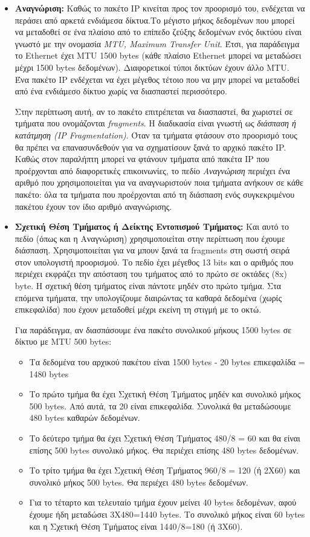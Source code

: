 \begin{itemize}
\item \textbf{Αναγνώριση:} Καθώς το πακέτο IP κινείται προς τον προορισμό του, ενδέχεται να περάσει από αρκετά ενδιάμεσα δίκτυα.Το μέγιστο μήκος δεδομένων που μπορεί να μεταδοθεί σε ένα πλαίσιο από το επίπεδο ζεύξης δεδομένων ενός δικτύου είναι γνωστό με την ονομασία \emph{MTU, Maximum Transfer Unit}. Έτσι, για παράδειγμα το Ethernet έχει MTU 1500 bytes (κάθε πλαίσιο Ethernet μπορεί να μεταδώσει μέχρι 1500 bytes δεδομένων). Διαφορετικοί τύποι δικτύων έχουν άλλο MTU. Ένα πακέτο IP ενδέχεται να έχει μέγεθος τέτοιο που να μην μπορεί να μεταδοθεί από ένα ενδιάμεσο δίκτυο χωρίς να διασπαστεί περισσότερο. 

Στην περίπτωση αυτή, αν το πακέτο επιτρέπεται να διασπαστεί, θα χωριστεί σε τμήματα που ονομάζονται \emph{fragments}. Η διαδικασία είναι γνωστή ως \emph{διάσπαση ή κατάτμηση (IP Fragmentation)}. Όταν τα τμήματα φτάσουν στο προορισμό τους θα πρέπει να επανασυνδεθούν για να σχηματίσουν ξανά το αρχικό πακέτο IP. Καθώς στον παραλήπτη μπορεί να φτάνουν τμήματα από πακέτα IP που προέρχονται από διαφορετικές επικοινωνίες, το πεδίο \emph{Αναγνώριση} περιέχει ένα αριθμό που χρησιμοποιείται για να αναγνωριστούν ποια τμήματα ανήκουν σε κάθε πακέτο: όλα τα τμήματα που προέρχονται από τη διάσπαση ενός συγκεκριμένου πακέτου έχουν τον ίδιο αριθμό αναγνώρισης.

\item \textbf{Σχετική Θέση Τμήματος ή Δείκτης Εντοπισμού Τμήματος:} Και αυτό το πεδίο (όπως και η Αναγνώριση) χρησιμοποιείται στην περίπτωση που έχουμε διάσπαση. Χρησιμοποιείται για να μπουν ξανά τα fragments στη σωστή σειρά στον υπολογιστή προορισμού. Το πεδίο έχει μέγεθος 13 bits και ο αριθμός που περιέχει εκφράζει την απόσταση του τμήματος από το πρώτο σε οκτάδες (8x) byte. Η σχετική θέση τμήματος είναι πάντοτε μηδέν στο πρώτο τμήμα. Στα επόμενα τμήματα, την υπολογίζουμε διαιρώντας τα καθαρά δεδομένα (χωρίς επικεφαλίδα) που έχουν μεταδοθεί μέχρι εκείνη τη στιγμή  με το οκτώ.

Για παράδειγμα, αν διασπάσουμε ένα πακέτο συνολικού μήκους 1500 bytes σε δίκτυο με MTU 500 bytes:

\begin{itemize}
\item Τα δεδομένα του αρχικού πακέτου είναι 1500 bytes - 20 bytes επικεφαλίδα = 1480 bytes
\item Το πρώτο τμήμα θα έχει Σχετική Θέση Τμήματος μηδέν και συνολικό μήκος 500 bytes. Από αυτά, τα 20 είναι επικεφαλίδα. Συνολικά θα μεταδώσουμε 480 bytes καθαρών δεδομένων.
\item Το δεύτερο τμήμα θα έχει Σχετική Θέση Τμήματος 480/8 = 60 και θα είναι επίσης 500 bytes συνολικό μήκος. Θα περιέχει επίσης 480 bytes δεδομένων.
\item Το τρίτο τμήμα θα έχει Σχετική Θέση Τμήματος 960/8 = 120 (ή 2Χ60) και συνολικό μήκος 500 bytes. Θα περιέχει 480 bytes δεδομένων.
\item Για το τέταρτο και τελευταίο τμήμα έχουν μείνει 40 bytes δεδομένων, αφού έχουμε ήδη μεταδώσει 3Χ480=1440 bytes. Το συνολικό μήκος είναι 60 bytes και η Σχετική Θέση Τμήματος είναι 1440/8=180 (ή 3Χ60).
\end{itemize}   

\end{itemize}



 
